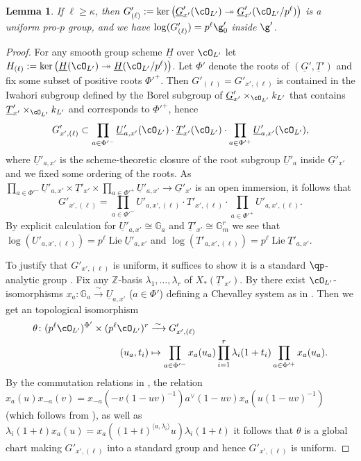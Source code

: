 \documentclass[a4paper]{amsart}
\numberwithin{equation}{section}
\newtheorem{lem}[thm]{Lemma}
\theoremstyle{remark}
\theoremstyle{definition}
\DeclareMathOperator{\Lie}{Lie}
\newcommand{\Z}{\mathbb{Z}}
\newcommand{\alggrp}[1]{\underline{#1}}
\newcommand{\ang}[1]{\langle #1\rangle}
\newcommand{\congto}{\xrightarrow{\,\sim\,}}
\newcommand{\onto}{\twoheadrightarrow}
\begin{document}
\begin{lem}\label{lm:congruence-subgp}
  If $\ell \ge \kappa$, then $G'_{(\ell)} := \ker\big(\alggrp G'_{x'}(\cO_{L'}) \onto \alggrp G'_{x'}(\cO_{L'}/p^\ell)\big)$ is a uniform pro-$p$ group,
  and we have $\log(G'_{(\ell)}) = p^\ell \g'_0$ inside $\g'$.
\end{lem}

\begin{proof}
  For any smooth group scheme $\alggrp H$ over $\cO_{L'}$ let $H_{(\ell)} := \ker\big(\alggrp H(\cO_{L'}) \onto \alggrp H(\cO_{L'}/p^\ell)\big)$.
  Let $\Phi'$ denote the roots of $(\alggrp G', \alggrp T')$ and fix some subset of positive roots $\Phi'^+$.
  Then $G'_{(\ell)} = G'_{x',(\ell)}$ is contained in the Iwahori subgroup defined by the Borel subgroup of $\alggrp G'_{x'} \times_{\cO_{L'}} k_{L'}$
  that contains $\alggrp T'_{x'} \times_{\cO_{L'}} k_{L'}$ and corresponds to $\Phi'^+$, hence
  \begin{equation*}
    G'_{x',(\ell)} \subset \prod_{a \in \Phi'^-} \alggrp U'_{a,x'}(\cO_{L'}) \cdot \alggrp T'_{x'}(\cO_{L'}) \cdot \prod_{a \in \Phi'^+} \alggrp U'_{a,x'}(\cO_{L'}),
  \end{equation*}
  where $\alggrp U'_{a,x'}$ is the scheme-theoretic closure of the root subgroup $\alggrp U'_{a}$ inside $\alggrp G'_{x'}$   and we fixed some ordering of the roots. As $\prod_{a \in \Phi'^-} \alggrp U'_{a,x'} \times \alggrp T'_{x'} \times \prod_{a \in \Phi'^+} \alggrp U'_{a,x'} \to \alggrp G'_{x'}$
  is an open immersion,    it follows that
  \begin{equation*}
    G'_{x',(\ell)} = \prod_{a \in \Phi'^-} U'_{a,x',(\ell)} \cdot T'_{x',(\ell)}\cdot \prod_{a \in \Phi'^+} U'_{a,x',(\ell)}.
  \end{equation*}
  By explicit calculation for $\alggrp U'_{a,x'} \cong \mathbb G_a$ and $\alggrp T'_{x'} \cong \mathbb G_m^r$
  we see that $\log(U'_{a,x',(\ell)}) = p^\ell \Lie \alggrp U'_{a,x'}$ and $\log(T'_{a,x',(\ell)}) = p^\ell \Lie \alggrp T'_{a,x'}$.

  To justify that $G'_{x',(\ell)}$ is uniform, it suffices to show it is a standard $\qp$-analytic group \cite[Theorem 8.31]{DDMS}.
  Fix any $\Z$-basis $\lambda_1,\dots,\lambda_r$ of $X_*(\alggrp T'_{x'})$.
  By \cite[\S3.2.13, \S4.6.15]{BT2} there exist $\cO_{L'}$-isomorphisms $x_a \colon \mathbb G_a \congto \alggrp U_{a,x'}$
  ($a \in \Phi'$) defining a Chevalley system as in \cite[\S3.2.2]{BT2}.
  Then we get an topological isomorphism
  \begin{align*}
    \theta \colon (p^\ell \cO_{L'})^{\Phi'} \times (p^\ell \cO_{L'})^r &\congto G'_{x',(\ell)} \\
    (u_a, t_i) &\mapsto \prod_{a \in \Phi'^-} x_a(u_a) \prod_{i=1}^r \lambda_i(1+t_i) \prod_{a \in \Phi'^+} x_a(u_a).
  \end{align*}
  By the commutation relations in \cite[\S3.2.3]{BT2}, the relation $x_a(u)x_{-a}(v) = x_{-a}(-v(1-uv)^{-1}) a^\vee(1-uv) x_a(u(1-uv)^{-1})$
  (which follows from \cite[\S3.2.1]{BT2}), as well as $\lambda_i(1+t)x_a(u) = x_a((1+t)^{\ang{a,\lambda_i}}u)\lambda_i(1+t)$ 
  it follows that $\theta$ is a global chart making $G'_{x',(\ell)}$ into a standard group and hence $G'_{x',(\ell)}$ is uniform.


\end{proof}
\end{document}
